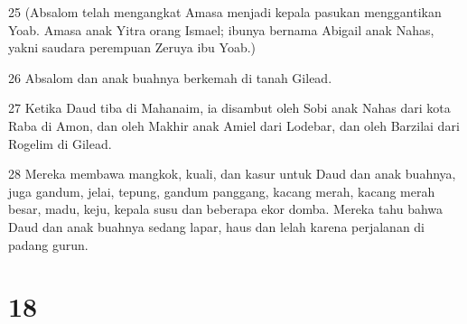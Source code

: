 \par 25 (Absalom telah mengangkat Amasa menjadi kepala pasukan menggantikan Yoab. Amasa anak Yitra orang Ismael; ibunya bernama Abigail anak Nahas, yakni saudara perempuan Zeruya ibu Yoab.)
\par 26 Absalom dan anak buahnya berkemah di tanah Gilead.
\par 27 Ketika Daud tiba di Mahanaim, ia disambut oleh Sobi anak Nahas dari kota Raba di Amon, dan oleh Makhir anak Amiel dari Lodebar, dan oleh Barzilai dari Rogelim di Gilead.
\par 28 Mereka membawa mangkok, kuali, dan kasur untuk Daud dan anak buahnya, juga gandum, jelai, tepung, gandum panggang, kacang merah, kacang merah besar, madu, keju, kepala susu dan beberapa ekor domba. Mereka tahu bahwa Daud dan anak buahnya sedang lapar, haus dan lelah karena perjalanan di padang gurun.

\chapter{18}

